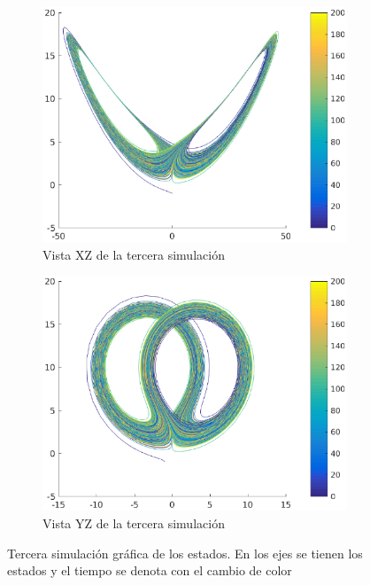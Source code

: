 \documentclass[12pt,letterpaper]{article}
\begin{document}
\begin{figure}
\begin{subfigure}[t]{0.36\textwidth}
		\label{fig:simulacion3xy}
	\end{subfigure}
        \vfill
        \begin{subfigure}[b]{0.36\textwidth}
		\includegraphics[width=\textwidth]{pictures/tercera_simulacion_xz}
		\caption{Vista XZ de la tercera simulación}
		\label{fig:simulacion3xz}
	\end{subfigure}
        \begin{subfigure}[b]{0.36\textwidth}
		\includegraphics[width=\textwidth]{pictures/tercera_simulacion_yz}
		\caption{Vista YZ de la tercera simulación}
		\label{fig:simulacion3yz}
	\end{subfigure}
	\caption{Tercera simulación gráfica de los estados. En los ejes se tienen los estados y el tiempo se denota con el cambio de color}
	\label{fig:simulacion3_total}
\end{figure}
\end{document}
